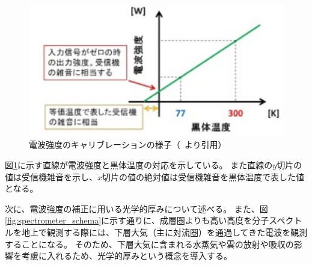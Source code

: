 \begin{figure}[htbp]
    \centering
    \includegraphics[width=\linewidth]{master_thesis_contents/master_thesis_fig/calibration.pdf}
    \caption{電波強度のキャリブレーションの様子（~\cite{ito2017master}より引用）}
    \label{fig:calibration}
\end{figure}
図\ref{fig:calibration}に示す直線が電波強度と黒体温度の対応を示している。
また直線の$y$切片の値は受信機雑音を示し、$x$切片の値の絶対値は受信機雑音を黒体温度で表した値となる。


次に、電波強度の補正に用いる光学的厚みについて述べる。
また、図\ref{fig:spectrometer_schema}に示す通りに、成層圏よりも高い高度を分子スペクトルを地上で観測する際には、下層大気（主に対流圏）を通過してきた電波を観測することになる。
そのため、下層大気に含まれる水蒸気や雲の放射や吸収の影響を考慮に入れるため、光学的厚みという概念を導入する。


